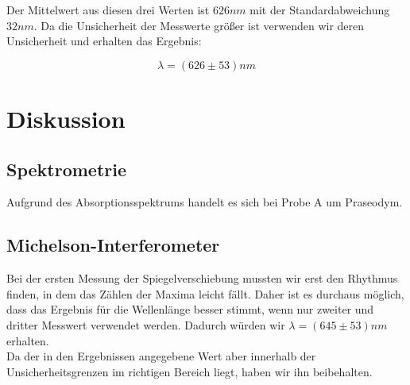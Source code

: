 \documentclass{article}
\begin{document}
Der Mittelwert aus diesen drei Werten ist $626nm$ mit der Standardabweichung $32nm$. Da die Unsicherheit der Messwerte größer ist verwenden wir deren Unsicherheit und erhalten das Ergebnis:

$$\boxed{\lambda=(626 \pm 53)nm}$$

\section{Diskussion}	

\subsection{Spektrometrie}

Aufgrund des Absorptionsspektrums handelt es sich bei Probe A um Praseodym. 

\subsection{Michelson-Interferometer}
Bei der ersten Messung der Spiegelverschiebung mussten wir erst den Rhythmus finden, in dem das Zählen der Maxima leicht fällt. Daher ist es durchaus möglich, dass das Ergebnis für die Wellenlänge besser stimmt, wenn nur zweiter und dritter Messwert verwendet werden. Dadurch würden wir $\lambda=(645 \pm 53)nm$ erhalten.\\
Da der in den Ergebnissen angegebene Wert aber innerhalb der Unsicherheitsgrenzen im richtigen Bereich liegt, haben wir ihn beibehalten.
																								
\end{document}
